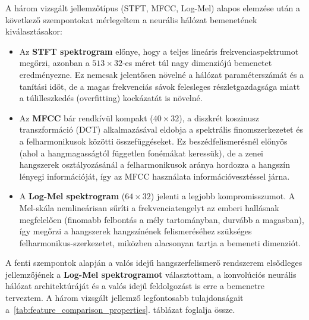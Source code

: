 A három vizsgált jellemzőtípus (STFT, MFCC, Log-Mel) alapos elemzése után a következő szempontokat mérlegeltem a neurális hálózat bemenetének kiválasztásakor:
\begin{itemize}
  \item Az \textbf{STFT spektrogram} előnye, hogy a teljes lineáris frekvenciaspektrumot megőrzi, azonban a $513 \times 32$-es méret túl nagy dimenziójú bemenetet eredményezne. Ez nemcsak jelentősen növelné a hálózat paraméterszámát és a tanítási időt, de a magas frekvenciás sávok felesleges részletgazdagsága miatt a túlilleszkedés (overfitting) kockázatát is növelné.
  \item Az \textbf{MFCC} bár rendkívül kompakt ($40 \times 32$), a diszkrét koszinusz transzformáció (DCT) alkalmazásával eldobja a spektrális finomszerkezetet és a felharmonikusok közötti összefüggéseket. Ez beszédfelismerésnél előnyös (ahol a hangmagasságtól független fonémákat keressük), de a zenei hangszerek osztályozásánál a felharmonikusok aránya hordozza a hangszín lényegi információját, így az MFCC használata információvesztéssel járna.
  \item A \textbf{Log-Mel spektrogram} ($64 \times 32$) jelenti a legjobb kompromisszumot. A Mel-skála nemlineárisan sűríti a frekvenciatengelyt az emberi hallásnak megfelelően (finomabb felbontás a mély tartományban, durvább a magasban), így megőrzi a hangszerek hangszínének felismeréséhez szükséges felharmonikus-szerkezetet, miközben alacsonyan tartja a bemeneti dimenziót.
\end{itemize}

A fenti szempontok alapján a valós idejű hangszerfelismerő rendszerem elsődleges jellemzőjének a \textbf{Log-Mel spektrogramot} választottam, a konvolúciós neurális hálózat architektúráját és a valós idejű feldolgozást is erre a bemenetre terveztem. A három vizsgált jellemző legfontosabb tulajdonságait a~\ref{tab:feature_comparison_properties}. táblázat foglalja össze.

\begin{table}[H]
  \centering
  \caption{A három vizsgált jellemzőkinyerési módszer összehasonlító elemzése}
  \label{tab:feature_comparison_properties}
\end{table}

